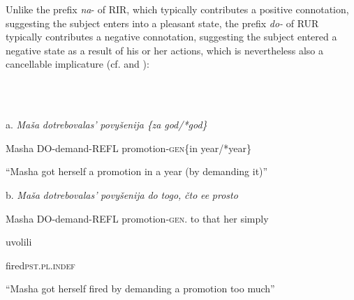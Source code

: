 \documentclass[output=paper,modfonts, nonflat]{langsci/langscibook}
\begin{document}
Unlike the prefix \textit{na}{}- of RIR, which typically contributes a positive connotation, suggesting the subject enters into a pleasant state, the prefix \textit{do{}-} of RUR typically contributes a negative connotation, suggesting the subject entered a negative state as a result of his or her actions, which is nevertheless also a cancellable implicature (cf.  and ):

\begin{styleinnerExample}
\ea%
    \label{ex:key:43}
    \gll\\
        \\
    \glt
    \z

          a.  \textit{Maša}   \textit{dotrebovalas’}          \textit{povyšenija}       \textit{\{za} \textit{god/*god\}}
\end{styleinnerExample}

\begin{styleinnerExample}
    Masha DO-demand-REFL promotion-\textsc{gen}\{in year/*year\}
\end{styleinnerExample}

\begin{styleinnerExample}
                     “Masha got herself  a promotion in a year (by demanding it)” 
\end{styleinnerExample}

\begin{styleinnerExample}
  b.  \textit{Maša}   \textit{dotrebovalas’}            \textit{povyšenija}            \textit{do} \textit{togo,} \textit{čto} \textit{ee}   \textit{prosto}
\end{styleinnerExample}

\begin{styleinnerExample}
    Masha DO-demand-REFL   promotion-\textsc{gen.}     to that\textsubscript{}  her simply 
\end{styleinnerExample}

\begin{styleinnerExample}
    uvolili
\end{styleinnerExample}

\begin{styleinnerExample}
    fired\textsc{pst.pl.indef}
\end{styleinnerExample}

\begin{styleinnerExample}
    “Masha got herself fired by demanding a promotion too much”
\end{styleinnerExample}
\end{document}
